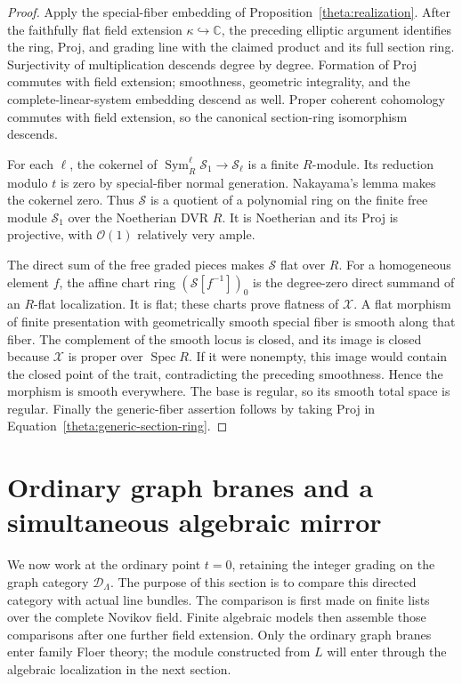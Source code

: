 \documentclass[11pt]{article}
\theoremstyle{definition}
\theoremstyle{remark}
\newcommand{\C}{\mathbb C}
\DeclareMathOperator{\Spec}{Spec}
\newcommand{\cO}{\mathcal O}
\numberwithin{equation}{section}
\begin{document}
\begin{proof}
Apply the special-fiber embedding of
Proposition~\ref{theta:realization}.  After the faithfully flat field
extension $\kappa\hookrightarrow\C$, the preceding elliptic argument
identifies the ring, Proj, and grading line with the claimed product
and its full section ring.  Surjectivity of multiplication descends
degree by degree.  Formation of Proj commutes with field extension;
smoothness, geometric integrality, and the complete-linear-system
embedding descend as well.  Proper coherent cohomology commutes with
field extension, so the canonical section-ring isomorphism descends.

For each $\ell$, the cokernel of
$\operatorname{Sym}^\ell_R\mathscr S_1\to\mathscr S_\ell$ is a finite
$R$-module.  Its reduction modulo $t$ is zero by special-fiber normal
generation.  Nakayama's lemma makes the cokernel zero.  Thus $\mathscr S$
is a quotient of a polynomial ring on the finite free module
$\mathscr S_1$ over the Noetherian DVR $R$.  It is Noetherian and its
Proj is projective, with $\cO(1)$ relatively very ample.

The direct sum of the free graded pieces makes $\mathscr S$ flat over
$R$.  For a homogeneous element $f$, the affine chart ring
$(\mathscr S[f^{-1}])_0$ is the degree-zero direct summand of an
$R$-flat localization.  It is flat; these charts prove flatness of
$\mathscr X$.  A flat morphism of finite presentation with geometrically
smooth special fiber is smooth along that fiber.  The complement of
the smooth locus is closed, and its image is closed because $\mathscr X$
is proper over $\Spec R$.  If it were nonempty, this image would contain
the closed point of the trait, contradicting the preceding smoothness.
Hence the morphism is smooth everywhere.  The base is regular, so its
smooth total space is regular.  Finally the generic-fiber assertion
follows by taking Proj in Equation~\eqref{theta:generic-section-ring}.
\end{proof}

\section{Ordinary graph branes and a simultaneous algebraic mirror}
\label{mirror:section}

We now work at the ordinary point $t=0$, retaining the integer grading
on the graph category $\mathcal D_\Lambda$.  The purpose of this section
is to compare this directed category with actual line bundles.  The
comparison is first made on finite lists over the complete Novikov
field.  Finite algebraic models then assemble those comparisons after
one further field extension.  Only the ordinary graph branes enter
family Floer theory; the module constructed from $L$ will enter through
the algebraic localization in the next section.
\end{document}
